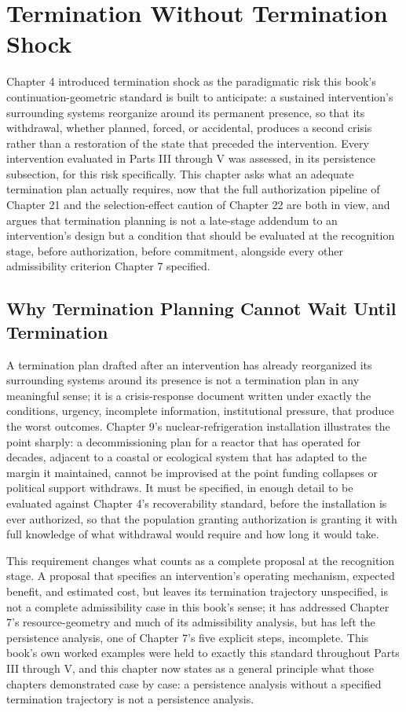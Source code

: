 \documentclass[11pt,oneside]{book}
\begin{document}
\chapter{Termination Without Termination Shock}

Chapter 4 introduced termination shock as the paradigmatic risk this book's continuation-geometric standard is built to anticipate: a sustained intervention's surrounding systems reorganize around its permanent presence, so that its withdrawal, whether planned, forced, or accidental, produces a second crisis rather than a restoration of the state that preceded the intervention. Every intervention evaluated in Parts III through V was assessed, in its persistence subsection, for this risk specifically. This chapter asks what an adequate termination plan actually requires, now that the full authorization pipeline of Chapter 21 and the selection-effect caution of Chapter 22 are both in view, and argues that termination planning is not a late-stage addendum to an intervention's design but a condition that should be evaluated at the recognition stage, before authorization, before commitment, alongside every other admissibility criterion Chapter 7 specified.

\section*{Why Termination Planning Cannot Wait Until Termination}

A termination plan drafted after an intervention has already reorganized its surrounding systems around its presence is not a termination plan in any meaningful sense; it is a crisis-response document written under exactly the conditions, urgency, incomplete information, institutional pressure, that produce the worst outcomes. Chapter 9's nuclear-refrigeration installation illustrates the point sharply: a decommissioning plan for a reactor that has operated for decades, adjacent to a coastal or ecological system that has adapted to the margin it maintained, cannot be improvised at the point funding collapses or political support withdraws. It must be specified, in enough detail to be evaluated against Chapter 4's recoverability standard, before the installation is ever authorized, so that the population granting authorization is granting it with full knowledge of what withdrawal would require and how long it would take.

This requirement changes what counts as a complete proposal at the recognition stage. A proposal that specifies an intervention's operating mechanism, expected benefit, and estimated cost, but leaves its termination trajectory unspecified, is not a complete admissibility case in this book's sense; it has addressed Chapter 7's resource-geometry and much of its admissibility analysis, but has left the persistence analysis, one of Chapter 7's five explicit steps, incomplete. This book's own worked examples were held to exactly this standard throughout Parts III through V, and this chapter now states as a general principle what those chapters demonstrated case by case: a persistence analysis without a specified termination trajectory is not a persistence analysis.
\end{document}

